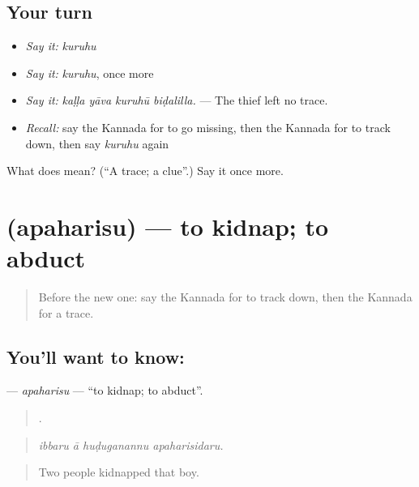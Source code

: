 \subsection*{Your turn}
\begin{itemize}
\raggedright
  \item \emph{Say it:} \emph{kuruhu}
  \item \emph{Say it:} \emph{kuruhu}, once more
  \item \emph{Say it:} \emph{kaḷḷa yāva kuruhū biḍalilla.} — The thief left no trace.
  \item \emph{Recall:} say the Kannada for to go missing, then the Kannada for to track down, then say \emph{kuruhu} again
\end{itemize}

\begin{tcolorbox}[breakable,colback=teal!4,colframe=teal!35!black,title={Before you move on}]
What does  mean? (\textquotedblleft{}A trace; a clue\textquotedblright{}.) Say it once more.
\end{tcolorbox}
\section[\texorpdfstring{\kn{ಅಪಹರಿಸು} (apaharisu)}{ಅಪಹರಿಸು (apaharisu)}]{ (apaharisu) — to kidnap; to abduct}

\label{lesson:KA-C326-apaharisu}



\begin{quote}
Before the new one: say the Kannada for to track down, then the Kannada for a trace.
\end{quote}

\subsection*{You'll want to know: }
\textbf{} — \emph{apaharisu} — \textquotedblleft{}to kidnap; to abduct\textquotedblright{}.

\begin{quote}
   .
\end{quote}

\begin{quote}
\emph{ibbaru ā huḍuganannu apaharisidaru.}
\end{quote}

\begin{quote}
Two people kidnapped that boy.
\end{quote}

